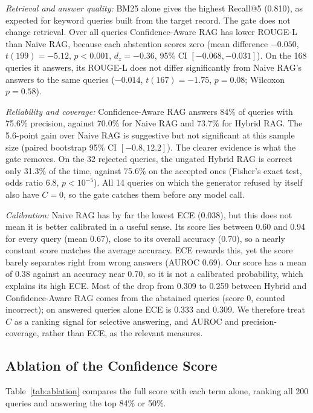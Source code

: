 \documentclass[conference]{IEEEtran}
\begin{document}
\noindent\textit{Retrieval and answer quality:} BM25 alone gives the
highest Recall@5 (0.810), as expected for keyword queries built from the
target record. The gate does not change retrieval. Over all queries
Confidence-Aware RAG has lower ROUGE-L than Naive RAG, because each
abstention scores zero (mean difference $-0.050$, $t(199)=-5.12$,
$p<0.001$, $d_z=-0.36$, 95\% CI $[-0.068,-0.031]$). On the 168 queries it
answers, its ROUGE-L does not differ significantly from Naive RAG's
answers to the same queries ($-0.014$, $t(167)=-1.75$, $p=0.08$; Wilcoxon
$p=0.58$).

\noindent\textit{Reliability and coverage:} Confidence-Aware RAG answers
84\% of queries with 75.6\% precision, against 70.0\% for Naive RAG and
73.7\% for Hybrid RAG. The 5.6-point gain over Naive RAG is suggestive
but not significant at this sample size (paired bootstrap 95\% CI
$[-0.8,12.2]$). The clearer evidence is what the gate removes. On the 32
rejected queries, the ungated Hybrid RAG is correct only 31.3\% of the
time, against 75.6\% on the accepted ones (Fisher's exact test, odds ratio
6.8, $p<10^{-5}$). All 14 queries on which the generator refused by itself
also have $C=0$, so the gate catches them before any model call.

\noindent\textit{Calibration:} Naive RAG has by far the lowest ECE (0.038),
but this does not mean it is better calibrated in a useful sense. Its
score lies between 0.60 and 0.94 for every query (mean 0.67), close to its
overall accuracy (0.70), so a nearly constant score matches the average
accuracy. ECE rewards this, yet the score barely separates right from
wrong answers (AUROC 0.69). Our score has a mean of 0.38 against an
accuracy near 0.70, so it is not a calibrated probability, which explains
its high ECE. Most of the drop from 0.309 to 0.259 between Hybrid and
Confidence-Aware RAG comes from the abstained queries (score 0, counted
incorrect); on answered queries alone ECE is 0.333 and 0.309. We
therefore treat $C$ as a ranking signal for selective answering, and
AUROC and precision-coverage, rather than ECE, as the relevant measures.

\subsection{Ablation of the Confidence Score}
Table~\ref{tab:ablation} compares the full score with each term alone,
ranking all 200 queries and answering the top 84\% or 50\%.
\end{document}
